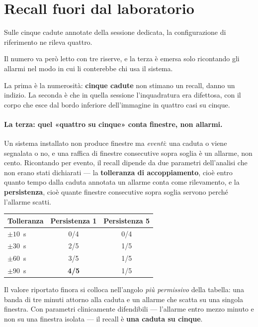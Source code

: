 \section{Recall fuori dal laboratorio}
\label{sec:recall-campo}

Sulle cinque cadute annotate della sessione dedicata, la configurazione di riferimento ne rileva quattro.

Il numero va però letto con tre riserve, e la terza è emersa solo ricontando gli allarmi nel modo in cui li conterebbe chi usa il sistema.

La prima è la numerosità: \textbf{cinque cadute} non stimano un recall, danno un indizio. La seconda è che in quella sessione l'inquadratura era difettosa, con il corpo che esce dal bordo inferiore dell'immagine in quattro casi su cinque.

\paragraph{La terza: quel «quattro su cinque» conta finestre, non allarmi.} Un sistema installato non produce finestre ma \emph{eventi}: una caduta o viene segnalata o no, e una raffica di finestre consecutive sopra soglia è un allarme, non cento. Ricontando per evento, il recall dipende da due parametri dell'analisi che non erano stati dichiarati --- la \textbf{tolleranza di accoppiamento}, cioè entro quanto tempo dalla caduta annotata un allarme conta come rilevamento, e la \textbf{persistenza}, cioè quante finestre consecutive sopra soglia servono perché l'allarme scatti.

\begin{center}
\begin{tabular}{lcc}
\toprule
Tolleranza & Persistenza 1 & Persistenza 5 \\
\midrule
$\pm 10$~s & 0/4 & 0/4 \\
$\pm 30$~s & 2/5 & 1/5 \\
$\pm 60$~s & 3/5 & 1/5 \\
$\pm 90$~s & \textbf{4/5} & 1/5 \\
\bottomrule
\end{tabular}
\end{center}

Il valore riportato finora si colloca nell'angolo \emph{più permissivo} della tabella: una banda di tre minuti attorno alla caduta e un allarme che scatta su una singola finestra. Con parametri clinicamente difendibili --- l'allarme entro mezzo minuto e non su una finestra isolata --- il recall è \textbf{una caduta su cinque}.

